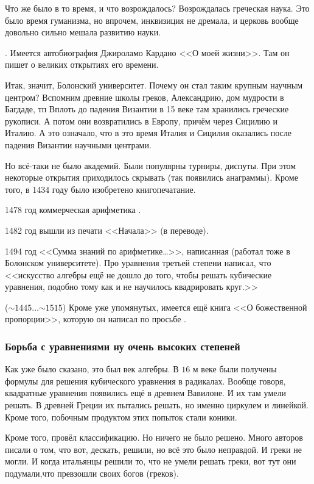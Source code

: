\documentclass[a4paper,oneside,fleqn,10pt]{article}
\newcommand{\pe}[2]{${#1}\ldots{#2}$}
\begin{document}
Что же было в то время, и что возрождалось? Возрождалась греческая наука.
Это было время гуманизма, но впрочем, инквизиция не дремала, и церковь вообще довольно сильно
мешала развитию науки.

. Имеется автобиография Джироламо Кардано <<О моей жизни>>. Там он пишет о великих открытиях
его времени.

Итак, значит, Болонский университет. Почему он стал таким крупным научным центром?
Вспомним древние школы греков, Александрию, дом мудрости в Багдаде, тп
Вплоть до падения Византии в 15 веке там хранились греческие рукописи. А потом они возвратились в Европу,
причём через Сицилию и Италию. А это означало, что в это время Италия и Сицилия оказались после падения Византии
научными центрами.

Но всё-таки не было академий. Были популярны турниры, диспуты. При этом некоторые открытия
приходилось скрывать (так появились анаграммы). Кроме того, в 1434 году было изобретено книгопечатание.

1478 год коммерческая арифметика .

1482 год вышли из печати <<Начала>> (в переводе).

1494 год <<Сумма знаний по арифметике\ldots>>, написанная  (работал тоже
в Болонском университете). Про уравнения третьей степени написал, что <<искусство алгебры
ещё не дошло до того, чтобы решать кубические уравнения, подобно тому
как и не научилось квадрировать круг.>>

 (\pe{{\sim}1445}{{\sim}1515}) Кроме уже упомянутых,
имеется ещё книга <<О божественной пропорции>>, которую он написал по просьбе
.

\subsubsection{Борьба с уравнениями ну очень высоких степеней}

Как уже было сказано, это был век алгебры. В $16$ м веке были получены формулы
для решения кубического уравнения в радикалах. Вообще говоря, квадратные уравнения появились
ещё в древнем Вавилоне. И их там умели решать. В древней Греции их пытались решать, но именно
циркулем и линейкой. Кроме того, побочным продуктом этих попыток стали коники.

Кроме того,  провёл классификацию. Но ничего не было решено. Много авторов писали
о том, что вот, дескать, решили, но всё это было неправдой. И греки не могли.
И когда итальянцы решили то, что не умели решать греки, вот тут они подумали,что превзошли своих богов (греков).
\end{document}
